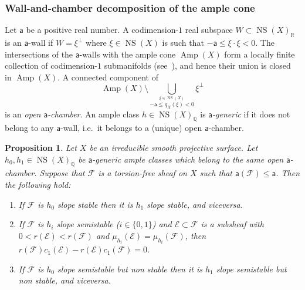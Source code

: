 \documentclass[11pt]{amsart}
\newcommand{\QQ}{{\mathbb Q}}
\newcommand{\RR}{{\mathbb R}}
\let\mathcal\mathscr
\def\cE{\mathcal{E}}
\def\cF{\mathcal{F}}
\DeclareMathOperator{\Amp}{Amp}
\DeclareMathOperator{\NS}{NS}
\newtheorem{prp}[lmm]{Proposition}
\theoremstyle{definition}
\theoremstyle{remark}
\begin{document}
\subsubsection{Wall-and-chamber decomposition of the ample cone}\label{subsubsec:muricamere}
%
Let ${\mathsf a}$ be  a positive real number. A codimension-$1$ real subspace $W\subset\NS(X)_{\RR}$ is an ${\mathsf a}$-wall if $W=\xi^{\bot}$  where $\xi\in\NS(X)$ is such that
$-{\mathsf a}\le \xi\cdot\xi<0$. 
The intersections of the  ${\mathsf a}$-walls with the ample cone $\Amp(X)$  form a locally finite collection of codimension-$1$ submanifolds (see~\cite[Lemma~4.C.2]{huy-lehn:librofasci}), and hence their union is closed in 
$\Amp(X)$.  A connected component of 
%
\begin{equation}
%
\Amp(X)\setminus\bigcup_{\stackrel{\xi\in\NS(X)}{ -{\mathsf a}\le q_X(\xi)<0}}\xi^{\bot}
%
\end{equation}
%
 is an 
\emph{open ${\mathsf a}$-chamber}.  An ample class $h\in\NS(X)_{\QQ}$ is \emph{${\mathsf a}$-generic} if it does not belong to any ${\mathsf a}$-wall, i.e.~it belongs to a (unique) open ${\mathsf a}$-chamber. 
%
\begin{prp}\label{prp:padovagoa}
%
Let $X$ be an irreducible smooth projective surface. Let $h_0,h_1\in\NS(X)_{\QQ}$ be ${\mathsf a}$-generic ample classes which belong to the same 
open ${\mathsf a}$-chamber. Suppose that $\cF$ is a torsion-free sheaf on $X$ such that ${\mathsf a}(\cF)\le {\mathsf a}$. Then the following hold:
%
\begin{enumerate}
%
\item
%
If $\cF$ is $h_0$ slope stable then  it is $h_1$ slope stable, and viceversa.
%
\item
%
If $\cF$ is $h_i$ slope semistable ($i\in\{0,1\}$)  and $\cE\subset\cF$ is 
a subsheaf  with $0<r(\cE)<r(\cF)$ and $\mu_{h_i}(\cE)=\mu_{h_i}(\cF)$, then
$r(\cF)c_1(\cE)-r(\cE)c_1(\cF)=0$. 
%
\item
%
If $\cF$ is $h_0$ slope semistable but non stable then it is $h_1$ slope semistable but non stable, and viceversa.
%
\end{enumerate}
%
%
\end{prp}
%
%
\end{document}
